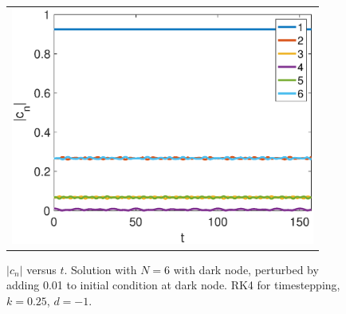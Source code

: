 \documentclass[12pt]{article}
\begin{document}
\begin{figure}[H]
\begin{center}
\begin{tabular}{c}
\includegraphics[width=10cm]{images/evenhole6perturbed.eps}
\end{tabular}
\end{center}
\caption{$|c_n|$ versus $t$. Solution with $N=6$ with dark node, perturbed by adding 0.01 to initial condition at dark node. RK4 for timestepping, $k=0.25$, $d=-1$.}
\label{fig:evenhole6perturbed}
\end{figure}




\end{document}
